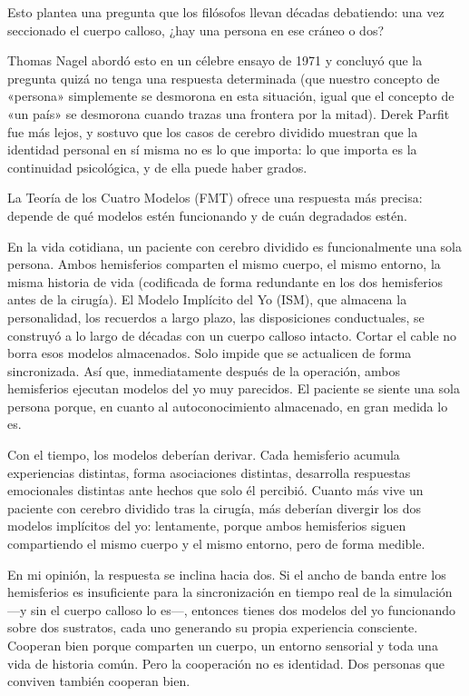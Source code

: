 \documentclass[11pt, twoside, openright]{book}
\begin{document}
Esto plantea una pregunta que los filósofos llevan décadas debatiendo: una vez seccionado el cuerpo calloso, ¿hay una persona en ese cráneo o dos?

Thomas Nagel abordó esto en un célebre ensayo de 1971 y concluyó que la pregunta quizá no tenga una respuesta determinada (que nuestro concepto de «persona» simplemente se desmorona en esta situación, igual que el concepto de «un país» se desmorona cuando trazas una frontera por la mitad). Derek Parfit fue más lejos, y sostuvo que los casos de cerebro dividido muestran que la identidad personal en sí misma no es lo que importa: lo que importa es la continuidad psicológica, y de ella puede haber grados.

La Teoría de los Cuatro Modelos (FMT) ofrece una respuesta más precisa: depende de qué modelos estén funcionando y de cuán degradados estén.

En la vida cotidiana, un paciente con cerebro dividido es funcionalmente una sola persona. Ambos hemisferios comparten el mismo cuerpo, el mismo entorno, la misma historia de vida (codificada de forma redundante en los dos hemisferios antes de la cirugía). El Modelo Implícito del Yo (ISM), que almacena la personalidad, los recuerdos a largo plazo, las disposiciones conductuales, se construyó a lo largo de décadas con un cuerpo calloso intacto. Cortar el cable no borra esos modelos almacenados. Solo impide que se actualicen de forma sincronizada. Así que, inmediatamente después de la operación, ambos hemisferios ejecutan modelos del yo muy parecidos. El paciente se siente una sola persona porque, en cuanto al autoconocimiento almacenado, en gran medida lo es.

Con el tiempo, los modelos deberían derivar. Cada hemisferio acumula experiencias distintas, forma asociaciones distintas, desarrolla respuestas emocionales distintas ante hechos que solo él percibió. Cuanto más vive un paciente con cerebro dividido tras la cirugía, más deberían divergir los dos modelos implícitos del yo: lentamente, porque ambos hemisferios siguen compartiendo el mismo cuerpo y el mismo entorno, pero de forma medible.

En mi opinión, la respuesta se inclina hacia dos. Si el ancho de banda entre los hemisferios es insuficiente para la sincronización en tiempo real de la simulación ---y sin el cuerpo calloso lo es---, entonces tienes dos modelos del yo funcionando sobre dos sustratos, cada uno generando su propia experiencia consciente. Cooperan bien porque comparten un cuerpo, un entorno sensorial y toda una vida de historia común. Pero la cooperación no es identidad. Dos personas que conviven también cooperan bien.
\end{document}
